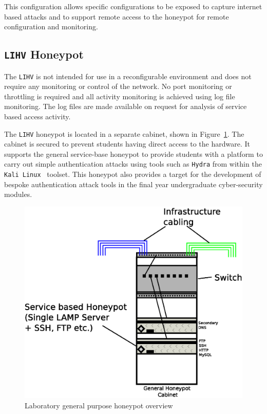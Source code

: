 This configuration allows specific configurations to be exposed to capture internet based attacks and to support remote access to the honeypot for remote configuration and monitoring.

\subsection{\texttt{LIHV} Honeypot}

The \texttt{LIHV} is not intended for use in a reconfigurable environment and does not require any monitoring or control of the network. No port monitoring or throttling is required and all activity monitoring is achieved using log file monitoring. The log files are made available on request for analysis of service based access activity.
 
The \texttt{LIHV} honeypot is located in a separate cabinet, shown in Figure~\ref{fig:Overview2}. The cabinet is secured to prevent students having direct access to the hardware. It supports the general service-base honeypot to provide students with a platform to carry out simple authentication attacks using tools such as \texttt{Hydra} from within the \texttt{Kali Linux}~\cite{OS:17} toolset. This honeypot also provides a target for the development of bespoke authentication attack tools in the final year undergraduate cyber-security modules.

\begin{figure}[h]
\begin{center}
	\includegraphics[scale=0.4]{Images/Infrastructure2.eps}
\caption{Laboratory general purpose honeypot overview}
\label{fig:Overview2}
\end{center}
\end{figure}

